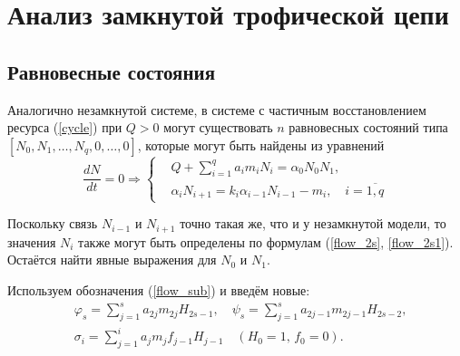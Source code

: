 \section{Анализ замкнутой трофической цепи}
\subsection{Равновесные состояния}
    Аналогично незамкнутой системе, в системе с частичным восстановлением ресурса (\ref{cycle}) при \(Q > 0\) могут существовать \( n \) равновесных состояний типа \(\left[ N_0, N_1, \ldots, N_q, 0, \ldots, 0 \right]\), которые могут быть найдены из уравнений
    \begin{equation} \label{cycle_stationary_equations}
        \frac{dN}{dt} = 0 \Rightarrow
        \left\lbrace\begin{split}
            & Q + \sum_{i=1}^{q} a_i m_i N_i = \alpha_0 N_0 N_1, \\
            & \alpha_i N_{i+1} = k_i \alpha_{i-1} N_{i-1} - m_i, \quad i=\overline{1,q}                
        \end{split}\right.
    \end{equation}

    Поскольку связь \(N_{i-1}\) и \(N_{i+1}\) точно такая же, что и у незамкнутой модели, то значения \(N_i\) также могут быть определены по формулам (\ref{flow_2s}, \ref{flow_2s1}). Остаётся найти явные выражения для \(N_0\) и \( N_1\).
    
    Используем обозначения (\ref{flow_sub}) и введём новые:
    \begin{equation}
        \begin{split}
        & \varphi_s = \sum_{j=1}^{s} a_{2j} m_{2j} H_{2s-1}, \quad 
        \psi_s = \sum_{j=1}^{s} a_{2j-1} m_{2j-1} H_{2s-2}, \\
        & \sigma_i = \sum_{j=1}^{i} a_j m_j f_{j-1} H_{j-1} \quad (H_0 = 1, \, f_0 = 0).
        \end{split}
    \end{equation}

